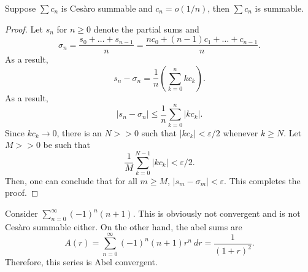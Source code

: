 \begin{theorem}
    Suppose $\sum c_n$ is Ces\`aro summable and $c_n = o(1/n)$, then $\sum c_n$ is summable.
\end{theorem}
\begin{proof}
    Let $s_n$ for $n\ge 0$ denote the partial sums and 
    \begin{equation*}
        \sigma_n = \frac{s_0 + \dots + s_{n - 1}}{n} = \frac{nc_0 + (n - 1)c_1 + \dots + c_{n - 1}}{n}.
    \end{equation*}
    As a result, 
    \begin{equation*}
        s_n - \sigma_n = \frac{1}{n}\left(\sum_{k = 0}^n kc_k\right).
    \end{equation*}
    As a result, 
    \begin{equation*}
        |s_n - \sigma_n|\le\frac{1}{n}\sum_{k = 0}^n |kc_k|.
    \end{equation*}
    Since $kc_k\to 0$, there is an $N >> 0$ such that $|kc_k| < \varepsilon/2$ whenever $k\ge N$. Let $M >> 0$ be such that 
    \begin{equation*}
        \frac{1}{M}\sum_{k = 0}^{N - 1}|kc_k| < \varepsilon/2.
    \end{equation*}
    Then, one can conclude that for all $m\ge M$, $|s_m - \sigma_m| < \varepsilon$. This completes the proof.
\end{proof}

\begin{example}
    Consider $\sum_{n = 0}^\infty (-1)^n(n + 1)$. This is obviously not convergent and is not Ces\`aro summable either. On the other hand, the abel sums are 
    \begin{equation*}
        A(r) = \sum_{n = 0}^\infty (-1)^n (n + 1)r^{n}~dr = \frac{1}{(1 + r)^2}.
    \end{equation*}
    Therefore, this series is Abel convergent.
\end{example}